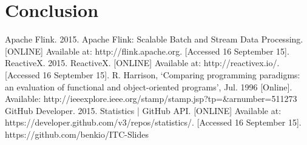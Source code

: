 \documentclass{article}
\begin{document}
\section{Conclusion}

\begin{thebibliography}{9}
Apache Flink. 2015. Apache Flink: Scalable Batch and Stream Data Processing. [ONLINE] Available at: http://flink.apache.org. [Accessed 16 September 15].
ReactiveX. 2015. ReactiveX. [ONLINE] Available at: http://reactivex.io/. [Accessed 16 September 15].
R. Harrison, \enquote*{Comparing programming paradigms: an evaluation of functional and object-oriented programs}, Jul. 1996 [Online]. Available: http://ieeexplore.ieee.org/stamp/stamp.jsp?tp=\&arnumber=511273
GitHub Developer. 2015. Statistics | GitHub API. [ONLINE] Available at: https://developer.github.com/v3/repos/statistics/. [Accessed 16 September 15].
https://github.com/benkio/ITC-Slides
\end{thebibliography}
\end{document}

